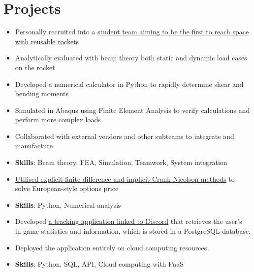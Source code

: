 \documentclass{cv}
\begin{document}
\section{Projects}
\begin{subsections}
    \subtitle{Karman Space Programme \hfill London, United Kingdom}
    \begin{itemize}
        \item Personally recruited into a \href{https://www.karmanspace.co.uk/}{student team aiming to be the first to reach space with reusable rockets}
        \item Analytically evaluated with beam theory both static and dynamic load cases on the rocket
        \item Developed a numerical calculator in Python to rapidly determine shear and bending moments
        \item Simulated in Abaqus using Finite Element Analysis to verify calculations and perform more complex loads
        \item Collaborated with external vendors and other subteams to integrate and manufacture
        \item \textbf{Skills}: Beam theory, FEA, Simulation, Teamwork, System integration
    \end{itemize}

    \begin{itemize}
        \item \href{https://github.com/thedylone/black-scholes-numerical}{Utilised explicit finite difference and implicit Crank-Nicolson methods} to solve European-style options price
        \item \textbf{Skills}: Python, Numerical analysis
    \end{itemize}

    \begin{itemize}
        \item Developed \href{https://thedylone.github.io/laffey-bot/}{a tracking application linked to Discord} that retrieves the user's in-game statistics and information, which is stored in a PostgreSQL database.
        \item Deployed the application entirely on cloud computing resources
        \item \textbf{Skills}: Python, SQL, API, Cloud computing with PaaS
    \end{itemize}


\end{subsections}
\end{document}
